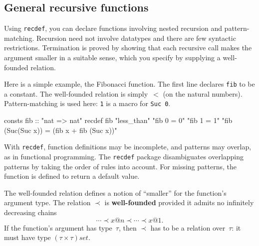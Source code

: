 

\subsection{General recursive functions}
\label{sec:HOL:recdef}

Using \texttt{recdef}, you can declare functions involving nested recursion
and pattern-matching.  Recursion need not involve datatypes and there are few
syntactic restrictions.  Termination is proved by showing that each recursive
call makes the argument smaller in a suitable sense, which you specify by
supplying a well-founded relation.

Here is a simple example, the Fibonacci function.  The first line declares
\texttt{fib} to be a constant.  The well-founded relation is simply~$<$ (on
the natural numbers).  Pattern-matching is used here: \texttt{1} is a
macro for \texttt{Suc~0}.
\begin{ttbox}
consts fib  :: "nat => nat"
recdef fib "less_than"
    "fib 0 = 0"
    "fib 1 = 1"
    "fib (Suc(Suc x)) = (fib x + fib (Suc x))"
\end{ttbox}

With \texttt{recdef}, function definitions may be incomplete, and patterns may
overlap, as in functional programming.  The \texttt{recdef} package
disambiguates overlapping patterns by taking the order of rules into account.
For missing patterns, the function is defined to return a default value.


The well-founded relation defines a notion of ``smaller'' for the function's
argument type.  The relation $\prec$ is \textbf{well-founded} provided it
admits no infinitely decreasing chains
\[ \cdots\prec x@n\prec\cdots\prec x@1. \]
If the function's argument has type~$\tau$, then $\prec$ has to be a relation
over~$\tau$: it must have type $(\tau\times\tau)set$.

